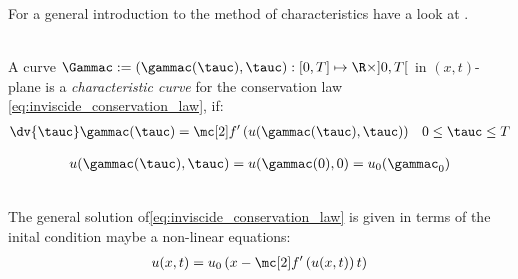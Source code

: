 \begin{sectionbox}\nospacing
   For a general introduction to the method of characteristics have a look at .
\end{sectionbox}
\begin{defnbox}\nospacing
    \begin{defn}
        \label{defn:characteristic_equations_for_conservation_laws}\leavevmode\\
        A curve $\Gammac:=(\gammac(\tauc),\tauc):[0,T]\mapsto\R\times]0,T[$ in $(x,t)$-plane is a \textit{characteristic curve}
        for the conservation law \cref{eq:inviscide_conservation_law}, if:
        \begin{align}
          \dv{\tauc}\gammac(\tauc)=\flux' \left(u(\gammac(\tauc),\tauc)\right)&&0\leq\tauc\leq T\label{eq:characteristic_equations_for_conservation_laws}
        \end{align}
    \end{defn}
\end{defnbox}
\begin{corbox}\nospacing
    \begin{cor}
        \begin{align}
            u(\gammac(\tauc),\tauc)=u(\gammac(0),0)=u_{0}(\gammac_{0})\label{eq:u_const_along_characteristic}
        \end{align}
    \end{cor}
\end{corbox}
\begin{propositionbox}\nospacing
    \begin{proposition}
        \label{proposition:general_solution_for_scalar_conservation_laws}\leavevmode\\
        The general solution of\cref{eq:inviscide_conservation_law} is given in terms of the inital condition
        maybe a non-linear equations:
        \begin{align}
          u(x,t)=u_{0}\left(x-\flux' \left(u(x,t)\right)t\right)\label{eq:general_solution_for_scalar_conservation_laws}
        \end{align}
    \end{proposition}
\end{propositionbox}
